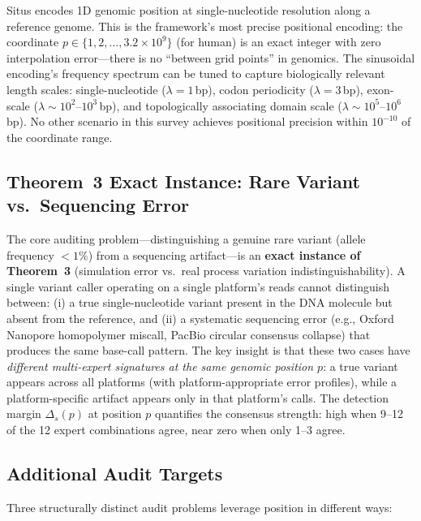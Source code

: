 \documentclass[12pt,a4paper]{article}
\begin{document}
Situs encodes 1D genomic position at single-nucleotide resolution along a reference genome. This is the framework's most precise positional encoding: the coordinate $p \in \{1, 2, \ldots, 3.2 \times 10^9\}$ (for human) is an exact integer with zero interpolation error---there is no ``between grid points'' in genomics. The sinusoidal encoding's frequency spectrum can be tuned to capture biologically relevant length scales: single-nucleotide ($\lambda = 1$\,bp), codon periodicity ($\lambda = 3$\,bp), exon-scale ($\lambda \sim 10^2$--$10^3$\,bp), and topologically associating domain scale ($\lambda \sim 10^5$--$10^6$\,bp). No other scenario in this survey achieves positional precision within $10^{-10}$ of the coordinate range.

\subsection{Theorem~3 Exact Instance: Rare Variant vs.\ Sequencing Error}

The core auditing problem---distinguishing a genuine rare variant (allele frequency $< 1\%$) from a sequencing artifact---is an \textbf{exact instance of Theorem~3} (simulation error vs.\ real process variation indistinguishability). A single variant caller operating on a single platform's reads cannot distinguish between: (i) a true single-nucleotide variant present in the DNA molecule but absent from the reference, and (ii) a systematic sequencing error (e.g., Oxford Nanopore homopolymer miscall, PacBio circular consensus collapse) that produces the same base-call pattern. The key insight is that these two cases have \textit{different multi-expert signatures at the same genomic position $p$}: a true variant appears across all platforms (with platform-appropriate error profiles), while a platform-specific artifact appears only in that platform's calls. The detection margin $\Delta_s(p)$ at position $p$ quantifies the consensus strength: high when 9--12 of the 12 expert combinations agree, near zero when only 1--3 agree.

\subsection{Additional Audit Targets}

Three structurally distinct audit problems leverage position in different ways:
\end{document}
